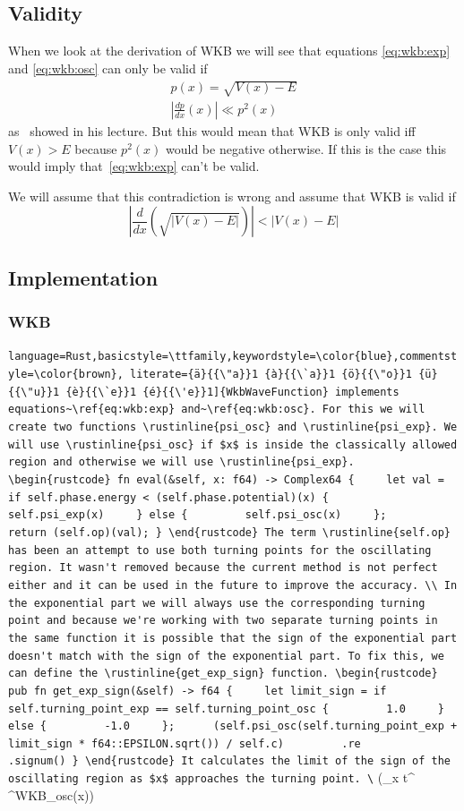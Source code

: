 \documentclass[11pt,DIV=10,final]{scrreprt} %
\providecommand{\rustinline}{\lstinline[language=Rust,basicstyle=\ttfamily,keywordstyle=\color{blue},commentstyle=\color{brown}, literate={ä}{{\"a}}1 {à}{{\`a}}1 {ö}{{\"o}}1 {ü}{{\"u}}1 {è}{{\`e}}1 {é}{{\'e}}1]} % für Inline-C++ Code
\begin{document}
\subsection{Validity}
When we look at the derivation of WKB we will see that equations \ref{eq:wkb:exp} and \ref{eq:wkb:osc} can only be valid if
\begin{align*}
  p(x) = \sqrt{V(x) - E} \\
  \left|\frac{dp}{dx}(x)\right| \ll p^{2}(x)
\end{align*}
as~\cite{zwiebach2018lecture} showed in his lecture.
But this would mean that WKB is only valid iff $V(x) > E$ because $p^{2}(x)$ would be negative otherwise.
If this is the case this would imply that~\ref{eq:wkb:exp} can't be valid.

We will assume that this contradiction is wrong and assume that WKB is valid if
\[
  \left|\frac{d}{dx}(\sqrt{|V(x) - E|})\right| < |V(x) - E|
\]

\subsection{Implementation}
\subsubsection{WKB}
\rustinline{WkbWaveFunction} implements equations~\ref{eq:wkb:exp} and~\ref{eq:wkb:osc}.
For this we will create two functions \rustinline{psi_osc} and \rustinline{psi_exp}.
We will use \rustinline{psi_osc} if $x$ is inside the classically allowed region and otherwise we will use \rustinline{psi_exp}.
\begin{rustcode}
fn eval(&self, x: f64) -> Complex64 {
    let val = if self.phase.energy < (self.phase.potential)(x) {
        self.psi_exp(x)
    } else {
        self.psi_osc(x)
    };

    return (self.op)(val);
}
\end{rustcode}
The term \rustinline{self.op} has been an attempt to use both turning points for the oscillating region. It wasn't removed because the
current method is not perfect either and it can be used in the future to improve the accuracy.
\\
In the exponential part we will always use the corresponding turning point and because we're working with two separate turning points in the same function
it is possible that the sign of the exponential part doesn't match with the sign of the exponential part.
To fix this, we can define the \rustinline{get_exp_sign} function.
\begin{rustcode}
pub fn get_exp_sign(&self) -> f64 {
    let limit_sign = if self.turning_point_exp == self.turning_point_osc {
        1.0
    } else {
        -1.0
    };

    (self.psi_osc(self.turning_point_exp + limit_sign * f64::EPSILON.sqrt()) / self.c)
        .re
        .signum()
}
\end{rustcode}
It calculates the limit of the sign of the oscillating region as $x$ approaches the turning point.
\[
  \left(\lim_{x \to t^{\pm}} \psi^{WKB}_{osc}(x)\right)
\]
\end{document}
